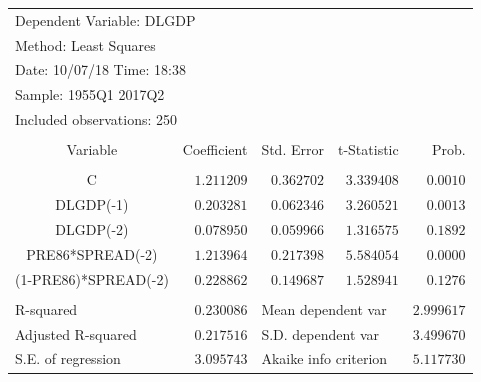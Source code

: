\documentclass[12pt]{report}
\begin{document}
\begin{table}[H]
	\centering
	\begin{tabular}{lrrrr}
		\multicolumn{3}{l}{Dependent Variable: DLGDP}&\multicolumn{1}{c}{}&\multicolumn{1}{c}{}\\
		\multicolumn{3}{l}{Method: Least Squares}&\multicolumn{1}{c}{}&\multicolumn{1}{c}{}\\
		\multicolumn{3}{l}{Date: 10/07/18   Time: 18:38}&\multicolumn{1}{c}{}&\multicolumn{1}{c}{}\\
		\multicolumn{3}{l}{Sample: 1955Q1 2017Q2}&\multicolumn{1}{c}{}&\multicolumn{1}{c}{}\\
		\multicolumn{3}{l}{Included observations: 250}&\multicolumn{1}{c}{}&\multicolumn{1}{c}{}\\
		[4.5pt] \hline \\ [-4.5pt]
		\multicolumn{1}{c}{Variable}&\multicolumn{1}{r}{Coefficient}&\multicolumn{1}{r}{Std. Error}&\multicolumn{1}{r}{t-Statistic}&\multicolumn{1}{r}{Prob.}\\
		[4.5pt] \hline \\ [-4.5pt]
		\multicolumn{1}{c}{C}&\multicolumn{1}{r}{$1.211209$}&\multicolumn{1}{r}{$0.362702$}&\multicolumn{1}{r}{$3.339408$}&\multicolumn{1}{r}{$0.0010$}\\
		\multicolumn{1}{c}{DLGDP(-1)}&\multicolumn{1}{r}{$0.203281$}&\multicolumn{1}{r}{$0.062346$}&\multicolumn{1}{r}{$3.260521$}&\multicolumn{1}{r}{$0.0013$}\\
		\multicolumn{1}{c}{DLGDP(-2)}&\multicolumn{1}{r}{$0.078950$}&\multicolumn{1}{r}{$0.059966$}&\multicolumn{1}{r}{$1.316575$}&\multicolumn{1}{r}{$0.1892$}\\
		\multicolumn{1}{c}{PRE86*SPREAD(-2)}&\multicolumn{1}{r}{$1.213964$}&\multicolumn{1}{r}{$0.217398$}&\multicolumn{1}{r}{$5.584054$}&\multicolumn{1}{r}{$0.0000$}\\
		\multicolumn{1}{c}{(1-PRE86)*SPREAD(-2)}&\multicolumn{1}{r}{$0.228862$}&\multicolumn{1}{r}{$0.149687$}&\multicolumn{1}{r}{$1.528941$}&\multicolumn{1}{r}{$0.1276$}\\
		[4.5pt] \hline \\ [-4.5pt]
		\multicolumn{1}{l}{R-squared}&\multicolumn{1}{r}{$0.230086$}&\multicolumn{2}{l}{Mean dependent var}&\multicolumn{1}{r}{$2.999617$}\\
		\multicolumn{1}{l}{Adjusted R-squared}&\multicolumn{1}{r}{$0.217516$}&\multicolumn{2}{l}{S.D. dependent var}&\multicolumn{1}{r}{$3.499670$}\\
		\multicolumn{1}{l}{S.E. of regression}&\multicolumn{1}{r}{$3.095743$}&\multicolumn{2}{l}{Akaike info criterion}&\multicolumn{1}{r}{$5.117730$}\\

\end{tabular}
\end{table}
\end{document}
